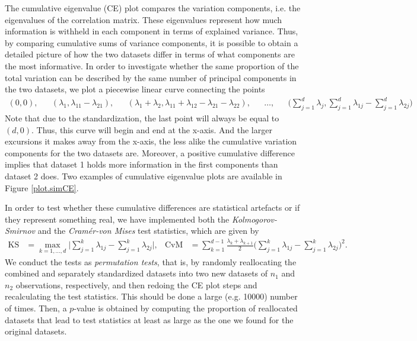 \documentclass[titlepage,11pt,twoside]{article}
\begin{document}
The cumulative eigenvalue (CE) plot compares the variation components, i.e. the eigenvalues of the correlation matrix. These eigenvalues represent how much information is withheld in each component in terms of explained variance. Thus, by comparing cumulative sums of variance components, it is possible to obtain a detailed picture of how the two datasets differ in terms of what components are the most informative. 
In order to investigate whether the same proportion of the total variation can be described by the same number of principal components in the two datasets, we plot a piecewise linear curve connecting the points
\begin{align*}
(0,0), &&
(\lambda_1,\lambda_{11}-\lambda_{21}), &&
(\lambda_1 + \lambda_2,\lambda_{11}+\lambda_{12}-\lambda_{21}-\lambda_{22}), &&
\ldots, &&
\bigg( \sum_{j=1}^d \lambda_j, \sum_{j=1}^d \lambda_{1j} - \sum_{j=1}^d \lambda_{2j} \bigg)
\end{align*}
Note that due to the standardization, the last point will always be equal to $(d,0)$. Thus, this curve will begin and end at the x-axis. And the larger excursions it makes away from the x-axis, the less alike the cumulative variation components for the two datasets are. Moreover, a positive cumulative difference implies that dataset 1 holds more information in the first components than dataset 2 does. Two examples of cumulative eigenvalue plots are available in Figure \ref{plot.simCE}.

In order to test whether these cumulative differences are statistical artefacts or if they represent something real, we have implemented both the \emph{Kolmogorov-Smirnov} and the \emph{Cram\'er-von Mises} test statistics, which are given by
\begin{align*}
\text{KS} &= \max_{k=1,\dotsc,d} \bigg\lvert \sum_{j=1}^k \lambda_{1j} - \sum_{j=1}^k \lambda_{2j} \bigg\rvert, &
\text{CvM} &= \sum_{k=1}^{d-1} \frac{\lambda_k + \lambda_{k+1}}{2} \bigg( \sum_{j=1}^k \lambda_{1j} - \sum_{j=1}^k \lambda_{2j} \bigg)^2.
\end{align*}
We conduct the tests as \textit{permutation tests}, that is, by randomly reallocating the combined and separately standardized datasets into two new datasets of $n_1$ and $n_2$ observations, respectively, and then redoing the CE plot steps and recalculating the test statistics. This should be done a large (e.g. 10000) number of times. Then, a $p$-value is obtained by computing the proportion of reallocated datasets that lead to %
test statistics at least as large as %
the one we found for the original datasets.
\end{document}
